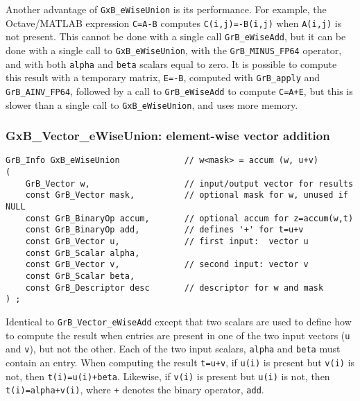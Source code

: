 \documentclass[12pt]{article}
\begin{document}
{Another advantage of \verb'GxB_eWiseUnion' is its performance.  For example,
the Octave/MATLAB expression \verb'C=A-B' computes \verb'C(i,j)=-B(i,j)' when
\verb'A(i,j)' is not present.  This cannot be done with a single call
\verb'GrB_eWiseAdd', but it can be done with a single call to
\verb'GxB_eWiseUnion', with the \verb'GrB_MINUS_FP64' operator, and with both
\verb'alpha' and \verb'beta' scalars equal to zero.  It is possible to
compute this result with a temporary matrix, \verb'E=-B', computed with
\verb'GrB_apply' and \verb'GrB_AINV_FP64', followed by a call to
\verb'GrB_eWiseAdd' to compute \verb'C=A+E', but this is slower than a single
call to \verb'GxB_eWiseUnion', and uses more memory.

\newpage
\subsubsection{{\sf GxB\_Vector\_eWiseUnion:} element-wise vector addition}
\label{eWiseUnion_vector}

\begin{mdframed}[userdefinedwidth=6in]
{\footnotesize
\begin{verbatim}
GrB_Info GxB_eWiseUnion             // w<mask> = accum (w, u+v)
(
    GrB_Vector w,                   // input/output vector for results
    const GrB_Vector mask,          // optional mask for w, unused if NULL
    const GrB_BinaryOp accum,       // optional accum for z=accum(w,t)
    const GrB_BinaryOp add,         // defines '+' for t=u+v
    const GrB_Vector u,             // first input:  vector u
    const GrB_Scalar alpha,
    const GrB_Vector v,             // second input: vector v
    const GrB_Scalar beta,
    const GrB_Descriptor desc       // descriptor for w and mask
) ;
\end{verbatim} } \end{mdframed}

Identical to \verb'GrB_Vector_eWiseAdd' except that two scalars are used
to define how to compute the result when entries are present in one of
the two input vectors (\verb'u' and \verb'v'), but not the other.
Each of the two input scalars, \verb'alpha' and \verb'beta'
must contain an entry.
When computing the result \verb't=u+v',
if \verb'u(i)' is present but \verb'v(i)' is not, then \verb't(i)=u(i)+beta'.
Likewise,
if \verb'v(i)' is present but \verb'u(i)' is not, then \verb't(i)=alpha+v(i)',
where \verb'+' denotes the binary operator, \verb'add'.

}
\end{document}
